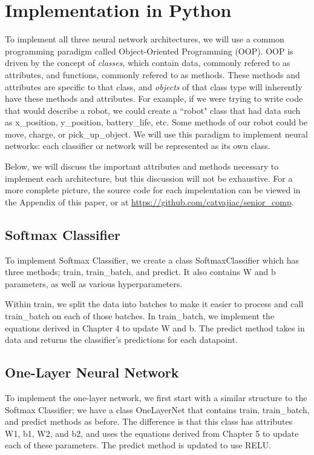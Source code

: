 \newpage \section{Implementation in Python}\label{ch:python}

To implement all three neural network architectures, we will use a common
programming paradigm called Object-Oriented Programming (OOP). OOP is driven by
the concept of \textit{classes}, which contain data, commonly refered to as
attributes, and functions, commonly refered to as methods. These methods and
attributes are specific to that class, and \textit{objects} of that class type
will inherently have these methods and attributes. For example, if we were
trying to write code that would describe a robot, we could create a ``robot"
class that had data such as {\ttfamily x\_position}, {\ttfamily y\_position},
{\ttfamily battery\_life}, etc. Some methods of our robot could be {\ttfamily
move}, {\ttfamily charge}, or {\ttfamily pick\_up\_object}. We will use this
paradigm to implement neural networks: each classifier or network will be
represented as its own class.

Below, we will discuss the important attributes and methods necessary to
implement each architecture, but this discussion will not be exhaustive. For a
more complete picture, the source code for each impelentation can be viewed in
the Appendix of this paper, or at
\url{https://github.com/catvajiac/senior\_comp}.


\subsection{Softmax Classifier} To implement Softmax Classifier, we create a
class {\ttfamily SoftmaxClassifier} which has three methods; {\ttfamily train},
{\ttfamily train\_batch}, and {\ttfamily predict}. It also contains {\ttfamily
W} and {\ttfamily b} parameters, as well as various hyperparameters.

Within {\ttfamily train}, we split the data into batches to make it easier to
process and call {\ttfamily train\_batch} on each of those batches. In
{\ttfamily train\_batch}, we implement the equations derived in Chapter 4 to
update W and b. The {\ttfamily predict} method takes in data and returns the
classifier's predictions for each datapoint.

\subsection{One-Layer Neural Network} To implement the one-layer network, we
first start with a similar structure to the Softmax Classifier; we have a class
{\ttfamily OneLayerNet} that contains {\ttfamily train}, {\ttfamily
train\_batch}, and {\ttfamily predict} methods as before.  The difference is
that this class has attributes {\ttfamily W1}, {\ttfamily b1}, {\ttfamily W2},
and {\ttfamily b2}, and uses the equations derived from Chapter 5 to update
each of these parameters. The {\ttfamily predict} method is updated to use
RELU.

